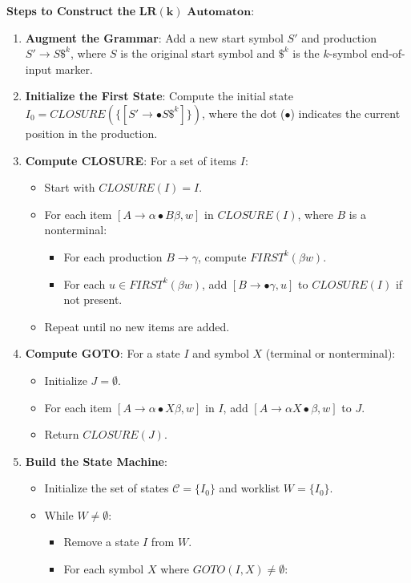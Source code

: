 \textbf{Steps to Construct the} $\mathbf{LR(k) \text{ Automaton}}$:
\begin{enumerate}
\item \textbf{Augment the Grammar}: Add a new start symbol $S'$ and production $S' \to S \$^k$, where $S$ is the original start symbol and $\$^k$ is the $k$-symbol end-of-input marker.
\item \textbf{Initialize the First State}: Compute the initial state $I_0 = CLOSURE(\{[S' \to \bullet S \$^k]\})$, where the dot ($\bullet$) indicates the current position in the production.
\item \textbf{Compute CLOSURE}: For a set of items $I$:
   \begin{itemize}
   \item Start with $CLOSURE(I) = I$.
   \item For each item $[A \to \alpha \bullet B \beta, w]$ in $CLOSURE(I)$, where $B$ is a nonterminal:
     \begin{itemize}
     \item For each production $B \to \gamma$, compute $FIRST^k(\beta w)$.
     \item For each $u \in FIRST^k(\beta w)$, add $[B \to \bullet \gamma, u]$ to $CLOSURE(I)$ if not present.
     \end{itemize}
   \item Repeat until no new items are added.
   \end{itemize}
\item \textbf{Compute GOTO}: For a state $I$ and symbol $X$ (terminal or nonterminal):
   \begin{itemize}
   \item Initialize $J = \emptyset$.
   \item For each item $[A \to \alpha \bullet X \beta, w]$ in $I$, add $[A \to \alpha X \bullet \beta, w]$ to $J$.
   \item Return $CLOSURE(J)$.
   \end{itemize}
\item \textbf{Build the State Machine}:
   \begin{itemize}
   \item Initialize the set of states $\mathcal{C} = \{I_0\}$ and worklist $W = \{I_0\}$.
   \item While $W \neq \emptyset$:
     \begin{itemize}
     \item Remove a state $I$ from $W$.
     \item For each symbol $X$ where $GOTO(I, X) \neq \emptyset$:

\end{itemize}
\end{itemize}
\end{enumerate}

